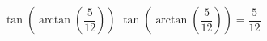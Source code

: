  {$\tan\left(\arctan\left(\dfrac{5}{12}\right)\right)$}
{ $\tan\left(\arctan\left(\dfrac{5}{12}\right)\right) = \dfrac{5}{12}$}

